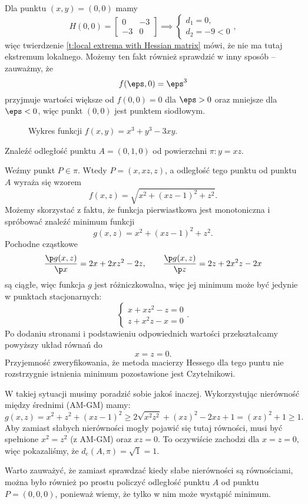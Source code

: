 \begin{solution}
    Dla punktu $(x, y) = (0, 0)$ mamy
    \[ H(0, 0) = \begin{bmatrix}
        0 & -3 \\
        -3 & 0
    \end{bmatrix} \implies \begin{cases} d_1 = 0,\\ d_2 = -9 < 0 \end{cases}, \]
    więc twierdzenie \ref{t:local extrema with Hessian matrix} mówi, że nie ma tutaj ekstremum lokalnego. Możemy ten fakt również sprawdzić w inny sposób -- zauważmy, że
    \[ f(\eps, 0) = \eps^3 \]
    przyjmuje wartości większe od $f(0, 0) = 0$ dla $\eps > 0$ oraz mniejsze dla $\eps < 0$, więc punkt $(0, 0)$ jest punktem siodłowym.
\end{solution}

\begin{figure}[H]
    \centering
    \caption{Wykres funkcji $f(x, y) = x^3 + y^3 - 3xy$.}
\end{figure}

\begin{example}
    Znaleźć odległość punktu $A = (0, 1, 0)$ od powierzchni $\pi : y = xz$.
\end{example}
\begin{solution}
    Weźmy punkt $P \in \pi$. Wtedy $P = (x, xz, z)$, a odległość tego punktu od punktu $A$ wyraża się wzorem
    \[ f(x, z) = \sqrt{x^2 + (xz- 1)^2 + z^2}. \]
    Możemy skorzystać z faktu, że funkcja pierwiastkowa jest monotoniczna i spróbować znaleźć minimum funkcji
    \[ g(x, z) = x^2 + (xz - 1)^2 + z^2. \]
    Pochodne cząstkowe
    \[ \frac{\p g(x, z)}{\p x} = 2x + 2xz^2 - 2z, \qquad \frac{\p g(x, z)}{\p z} = 2z + 2x^2z - 2x \]
    są ciągłe, więc funkcja $g$ jest różniczkowalna, więc jej minimum może być jedynie w punktach stacjonarnych:
    \[ \begin{cases} x + xz^2 - z = 0 \\ z + x^2z - x = 0 \end{cases}. \]
    Po dodaniu stronami i podstawieniu odpowiednich wartości przekształcamy powyższy układ równań do
    \[ x = z = 0. \]
    Przyjemność zweryfikowania, że metoda macierzy Hessego dla tego puntu nie rozstrzygnie istnienia minimum pozostawione jest Czytelnikowi.

    W takiej sytuacji musimy poradzić sobie jakoś inaczej. Wykorzystując nierówność między średnimi (AM-GM) mamy:
    \[ g(x, z) = x^2 + z^2 + (xz - 1)^2 \geq 2\sqrt{x^2z^2} + (xz)^2 - 2xz + 1 = (xz)^2 + 1 \geq 1. \]
    Aby zamiast słabych nierówności mogły pojawić się tutaj równości, musi być spełnione $x^2 = z^2$ (z AM-GM) oraz $xz = 0$. To oczywiście zachodzi dla $x = z = 0$, więc pokazaliśmy, że $d_e(A, \pi) = \sqrt{1} = 1$.
\end{solution}

Warto zauważyć, że zamiast sprawdzać kiedy słabe nierówności są równościami, można było również po prostu policzyć odległość punktu $A$ od punktu $P = (0, 0, 0)$, ponieważ wiemy, że tylko w nim może wystąpić minimum.
